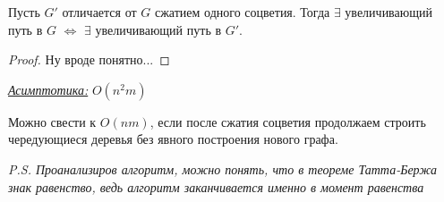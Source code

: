 \begin{proposition}
  Пусть $G'$ отличается от $G$ сжатием одного соцветия. Тогда $\exists$ увеличивающий путь в $G$ $\Longleftrightarrow$ $\exists$ увеличивающий путь в $G'$. 
\end{proposition}

\begin{proof}
  Ну вроде понятно...
\end{proof}

\textit{\underline{Асимптотика:}} $O(n^2 m)$

\begin{note}
  Можно свести к $O(nm)$, если после сжатия соцветия продолжаем строить чередующиеся деревья без явного построения нового графа. 
\end{note}

\textit{P.S. Проанализиров алгоритм, можно понять, что в теореме Татта-Бержа знак равенство, ведь алгоритм заканчивается именно в момент равенства} 